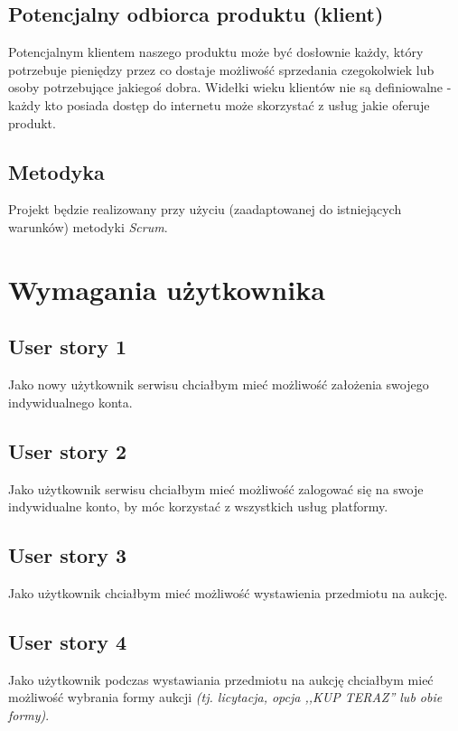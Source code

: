 \documentclass[a4paper]{article}
\begin{document}
\subsection{Potencjalny odbiorca produktu (klient)}

Potencjalnym klientem naszego produktu może być dosłownie każdy, który potrzebuje pieniędzy przez co dostaje możliwość sprzedania czegokolwiek lub osoby potrzebujące jakiegoś dobra. Widełki wieku klientów nie są definiowalne - każdy kto posiada dostęp do internetu może skorzystać z usług jakie oferuje produkt.

\subsection{Metodyka}

Projekt będzie realizowany przy użyciu (zaadaptowanej do istniejących warunków) metodyki {\em Scrum}. 

\section{Wymagania użytkownika}

\subsection{User story 1}
Jako nowy użytkownik serwisu chciałbym mieć możliwość założenia swojego indywidualnego konta.

\subsection{User story 2}
Jako użytkownik serwisu chciałbym mieć możliwość zalogować się na swoje indywidualne konto, by móc korzystać z wszystkich usług platformy.

\subsection{User story 3}
Jako użytkownik chciałbym mieć możliwość wystawienia przedmiotu na aukcję.

\subsection{User story 4}
Jako użytkownik podczas wystawiania przedmiotu na aukcję chciałbym mieć możliwość wybrania formy aukcji \emph{(tj. licytacja, opcja ,,KUP TERAZ'' lub obie formy)}.
\end{document}
